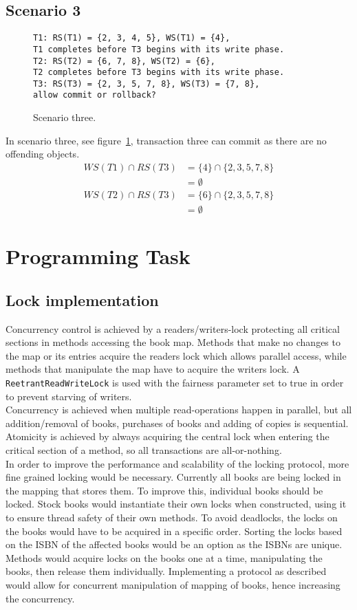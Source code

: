 \documentclass[12pt]{article}
\begin{document}
\subsection*{Scenario 3}
\begin{figure}[h!]
\texttt{T1: RS(T1) = \{2, 3, 4, 5\}, WS(T1) = \{4\},\\
T1 completes before T3 begins with its write phase.\\
T2: RS(T2) = \{6, 7, 8\}, WS(T2) = \{6\},\\
T2 completes before T3 begins with its write phase.\\
T3: RS(T3) = \{2, 3, 5, 7, 8\}, WS(T3) = \{7, 8\},\\
allow commit or rollback?}
\caption{Scenario three.}
\label{sc3}
\end{figure}
In scenario three, see figure~\ref{sc3}, transaction three can commit as there are no offending objects.
\begin{align}
WS(T1) \cap RS(T3) &= \{4\} \cap \{2, 3, 5, 7, 8\}\\
&= \emptyset\\
WS(T2) \cap RS(T3) &= \{6\} \cap \{2, 3, 5, 7, 8\}\\
&= \emptyset
\end{align}
\section*{Programming Task}
\subsection*{Lock implementation}
Concurrency control is achieved by a readers/writers-lock protecting all critical sections in methods accessing the book map. Methods that make no changes to the map or its entries acquire the readers lock which allows parallel access, while methods that manipulate the map have to acquire the writers lock. A \verb|ReetrantReadWriteLock| is used with the fairness parameter set to true in order to prevent starving of writers. \\
Concurrency is achieved when multiple read-operations happen in parallel, but all addition/removal of books, purchases of books and adding of copies is sequential. \\
Atomicity is achieved by always acquiring the central lock when entering the critical section of a method, so all transactions are all-or-nothing.
\\
In order to improve the performance and scalability of the locking protocol, more fine grained locking would be necessary. Currently all books are being locked in the mapping that stores them. To improve this, individual books should be locked. Stock books would instantiate their own locks when constructed, using it to ensure thread safety of their own methods. To avoid deadlocks, the locks on the books would have to be acquired in a specific order. Sorting the locks based on the ISBN of the affected books would be an option as the ISBNs are unique. Methods would acquire locks on the books one at a time, manipulating the books, then release them individually. Implementing a protocol as described would allow for concurrent manipulation of mapping of books, hence increasing the concurrency.
\end{document}
